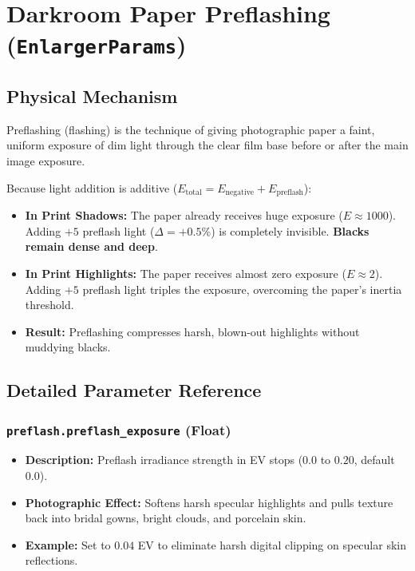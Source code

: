 \documentclass[11pt,a4paper]{article}
\begin{document}
\newpage

\section{Darkroom Paper Preflashing (\texttt{EnlargerParams})}

\subsection{Physical Mechanism}
Preflashing (flashing) is the technique of giving photographic paper a faint, uniform exposure of dim light through the clear film base before or after the main image exposure.

Because light addition is additive ($E_{\text{total}} = E_{\text{negative}} + E_{\text{preflash}}$):
\begin{itemize}[leftmargin=*]
    \item \textbf{In Print Shadows:} The paper already receives huge exposure ($E \approx 1000$). Adding $+5$ preflash light ($\Delta = +0.5\%$) is completely invisible. \textbf{Blacks remain dense and deep}.
    \item \textbf{In Print Highlights:} The paper receives almost zero exposure ($E \approx 2$). Adding $+5$ preflash light triples the exposure, overcoming the paper's inertia threshold.
    \item \textbf{Result:} Preflashing compresses harsh, blown-out highlights without muddying blacks.
\end{itemize}

\subsection{Detailed Parameter Reference}

\subsubsection{\texttt{preflash.preflash\_exposure} (Float)}
\begin{itemize}[leftmargin=*]
    \item \textbf{Description:} Preflash irradiance strength in EV stops ($0.0$ to $0.20$, default $0.0$).
    \item \textbf{Photographic Effect:} Softens harsh specular highlights and pulls texture back into bridal gowns, bright clouds, and porcelain skin.
    \item \textbf{Example:} Set to $0.04$ EV to eliminate harsh digital clipping on specular skin reflections.
\end{itemize}
\end{document}
